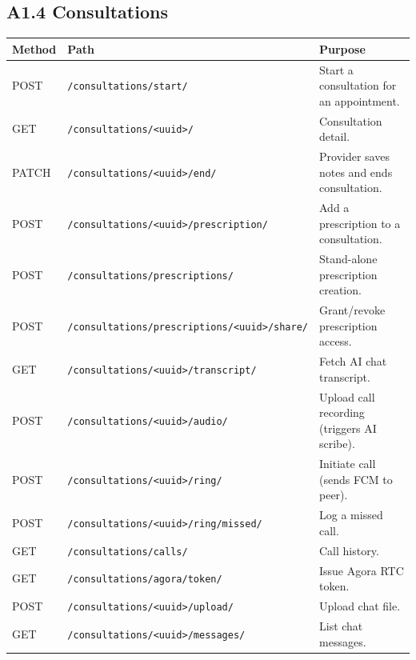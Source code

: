 \subsection*{A1.4 Consultations}

\begin{longtable}{|p{1.4cm}|p{6.5cm}|p{6.0cm}|}
\hline
\textbf{Method} & \textbf{Path} & \textbf{Purpose} \\ \hline

\endhead
POST  & \texttt{/consultations/start/}                                 & Start a consultation for an appointment. \\ \hline
GET   & \texttt{/consultations/<uuid>/}                                & Consultation detail. \\ \hline
PATCH & \texttt{/consultations/<uuid>/end/}                            & Provider saves notes and ends consultation. \\ \hline
POST  & \texttt{/consultations/<uuid>/prescription/}                   & Add a prescription to a consultation. \\ \hline
POST  & \texttt{/consultations/prescriptions/}                         & Stand-alone prescription creation. \\ \hline
POST  & \texttt{/consultations/prescriptions/<uuid>/share/}            & Grant/revoke prescription access. \\ \hline
GET   & \texttt{/consultations/<uuid>/transcript/}                     & Fetch AI chat transcript. \\ \hline
POST  & \texttt{/consultations/<uuid>/audio/}                          & Upload call recording (triggers AI scribe). \\ \hline
POST  & \texttt{/consultations/<uuid>/ring/}                           & Initiate call (sends FCM to peer). \\ \hline
POST  & \texttt{/consultations/<uuid>/ring/missed/}                    & Log a missed call. \\ \hline
GET   & \texttt{/consultations/calls/}                                 & Call history. \\ \hline
GET   & \texttt{/consultations/agora/token/}                           & Issue Agora RTC token. \\ \hline
POST  & \texttt{/consultations/<uuid>/upload/}                         & Upload chat file. \\ \hline
GET   & \texttt{/consultations/<uuid>/messages/}                       & List chat messages. \\ \hline

\end{longtable}
